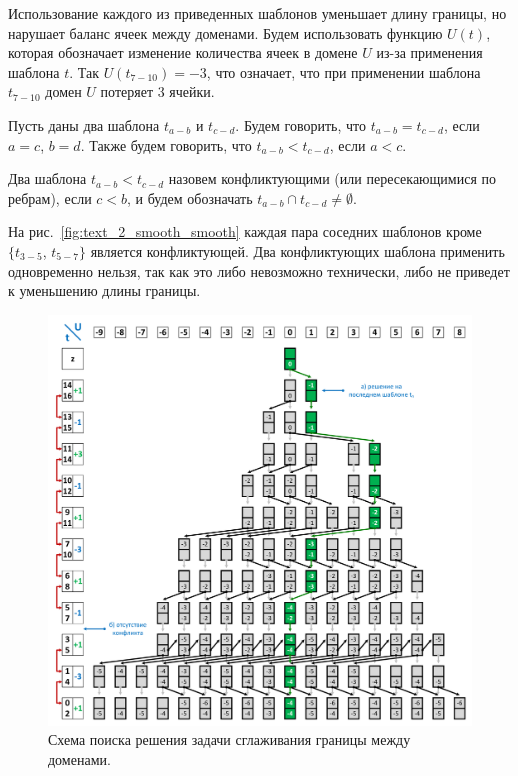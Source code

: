 Использование каждого из приведенных шаблонов уменьшает длину границы, но нарушает баланс ячеек между доменами.
Будем использовать функцию $U(t)$, которая обозначает изменение количества ячеек в домене $U$ из-за применения шаблона $t$.
Так $U(t_{7-10}) = -3$, что означает, что при применении шаблона $t_{7-10}$ домен $U$ потеряет 3 ячейки.

\begin{definition}
Пусть даны два шаблона $t_{a-b}$ и $t_{c-d}$.
Будем говорить, что $t_{a-b} = t_{c-d}$, если $a = c$, $b = d$.
Также будем говорить, что $t_{a-b} < t_{c-d}$, если $a < c$.
\end{definition}

\begin{definition}
Два шаблона $t_{a-b} < t_{c-d}$ назовем конфликтующими (или пересекающимися по ребрам), если $c < b$, и будем обозначать $t_{a-b} \cap t_{c-d} \ne \emptyset$.
\end{definition}

На рис.~\ref{fig:text_2_smooth_smooth} каждая пара соседних шаблонов кроме $\{ t_{3-5}$, $t_{5-7} \}$ является конфликтующей.
Два конфликтующих шаблона применить одновременно нельзя, так как это либо невозможно технически, либо не приведет к уменьшению длины границы.

\begin{figure}[!ht]
\centering
\includegraphics[width=1.0\textwidth]{fig/par_smooth-scheme-cut.pdf}
\singlespacing
{}\caption{Схема поиска решения задачи сглаживания границы между доменами.}
\label{fig:text_2_smooth_smooth_scheme}
\end{figure}

